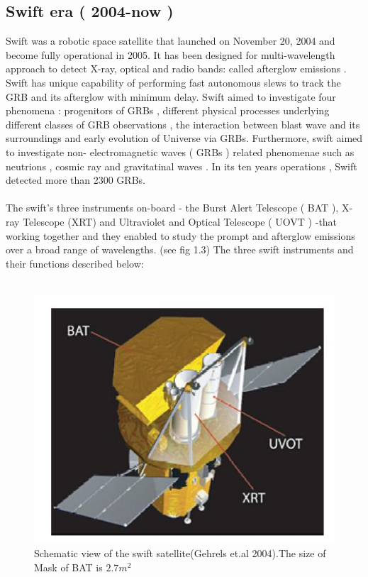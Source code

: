 \subsection{ Swift era  ( 2004-now ) }
 Swift was a robotic space   satellite that  launched  on November 20, 2004 and become fully  operational in 2005. It has  been designed for  multi-wavelength approach to detect  X-ray, optical and radio bands: called afterglow emissions .  Swift has unique  capability of performing  fast  autonomous  slews to  track the  GRB  and  its  afterglow  with  minimum  delay. Swift aimed  to  investigate four   phenomena : progenitors  of  GRBs , different physical  processes  underlying  different  classes of GRB  observations , the  interaction  between  blast wave  and  its  surroundings  and   early  evolution  of  Universe via  GRBs. Furthermore, swift  aimed  to investigate  non- electromagnetic waves ( GRBs ) related  phenomenae  such  as  neutrions , cosmic ray  and  gravitatinal  waves . In its ten years  operations , Swift  detected  more  than 2300 GRBs. \citep{ 4  ,  6 } \\\\
The swift's  three instruments on-board - the  Burst Alert Telescope ( BAT ),  X-ray Telescope (XRT) and   Ultraviolet and  Optical Telescope ( UOVT ) -that working together and they  enabled to study  the  prompt and afterglow emissions  over a broad range of wavelengths. (see fig 1.3) The  three  swift instruments and their functions described below:\citep{8}\citep{9} \\\\ 
\begin{figure}[h]
\begin{center}
\includegraphics[scale=0.4]{Figures/fig3.png}
\caption{Schematic view of the swift satellite(Gehrels et.al 2004).The size of Mask of BAT is $2.7m^{2}$  \citep{7}} 
\end{center}
\end{figure}
